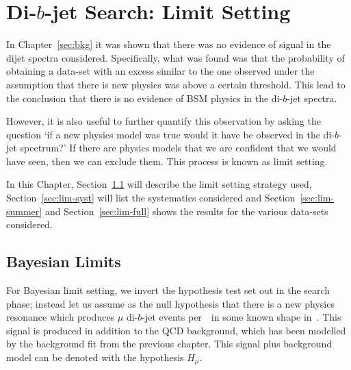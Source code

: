 \chapter{Di-$b$-jet Search: Limit Setting}
\label{sec:lim}

In Chapter~\ref{sec:bkg} it was shown that there was no evidence of signal in the dijet spectra considered.
Specifically, what was found was that the probability of obtaining a data-set with an excess similar to the one observed
under the assumption that there is new physics was above a certain threshold.
This lead to the conclusion that there is no evidence of BSM physics in the di-$b$-jet spectra.

However, it is also useful to further quantify this observation by asking the question
`if a new physics model was true would it have be observed in the di-$b$-jet spectrum?'
If there are physics models that we are confident that we would have seen, then we can exclude them.
This process is known as limit setting.

In this Chapter,
Section~\ref{sec:lim-strat} will describe the limit setting strategy used,
Section~\ref{sec:lim-syst} will list the systematics considered
and Section~\ref{sec:lim-summer} and Section~\ref{sec:lim-full}
shows the results for the various data-sets considered.

\section{Bayesian Limits}
\label{sec:lim-strat}

For Bayesian limit setting, we invert the hypothesis test set out in the search phase;
instead let us assume as the null hypothesis that there is a new physics resonance
which produces $\mu$ di-$b$-jet events per~\ifb~in some known shape in~\mjj.
This signal is produced in addition to the QCD background,
which has been modelled by the background fit from the previous chapter.
This signal plus background model can be denoted with the hypothesis $H_\mu$.

